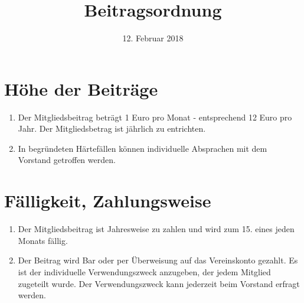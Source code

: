 \documentclass[a4paper, 12pt]{scrartcl}
\title{Beitragsordnung}
\author{}
\date{12. Februar 2018}
\begin{document}
\maketitle
\sffamily

\section{Höhe der Beiträge}
\begin{enumerate}
  \item Der Mitgliedsbeitrag beträgt 1 Euro pro Monat - entsprechend 12 Euro pro Jahr. Der Mitgliedsbetrag ist jährlich zu entrichten.
  \item In begründeten Härtefällen können individuelle Absprachen mit dem Vorstand getroffen werden.
\end{enumerate}

\section{Fälligkeit, Zahlungsweise}
\begin{enumerate}
	\item Der Mitgliedsbeitrag ist Jahresweise zu zahlen und wird zum 15. eines jeden Monats fällig.
	\item Der Beitrag wird Bar oder per Überweisung auf das Vereinskonto gezahlt. Es ist der individuelle Verwendungszweck anzugeben, der jedem Mitglied zugeteilt wurde. Der Verwendungszweck kann jederzeit beim Vorstand erfragt werden.
\end{enumerate}
\end{document}
